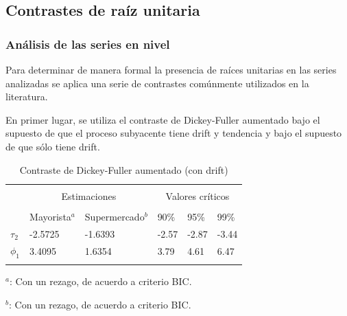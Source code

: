 \documentclass[12pt, twoside]{book}\usepackage[]{graphicx}\usepackage[]{color}
\numberwithin{equation}{section}
\numberwithin{theorem}{section}
\numberwithin{teorema}{section}
\numberwithin{defi}{section}
\numberwithin{prop}{section}
\numberwithin{defi}{section}
\theoremstyle{plain}
\begin{document}
\subsection{Contrastes de raíz unitaria}

\subsubsection{Análisis de las series en nivel}

Para determinar de manera formal la presencia de raíces unitarias en las series analizadas se aplica una serie de contrastes comúnmente utilizados en la literatura. 




En primer lugar, se utiliza el contraste de Dickey-Fuller aumentado bajo el supuesto de que el proceso subyacente tiene drift y tendencia y bajo el supuesto de que sólo tiene drift. 

\begin{center}
\begin{table}[!htpb]
\caption{Contraste de Dickey-Fuller aumentado (con drift)\label{tab:dickey1}}
\centering
\begin{threeparttable}
\begin{tabular}{@{}llllll@{}}
\toprule \\
\multicolumn{1}{l}{} & \multicolumn{2}{c}{Estimaciones} &
\multicolumn{3}{c}{Valores críticos} \\
\cmidrule(l){2-3} \cmidrule(l){4-6} \\
\multicolumn{1}{l}{} & \multicolumn{1}{c}{Mayorista$^{a}$} &
 \multicolumn{1}{c}{Supermercado$^{b}$} &
\multicolumn{1}{l}{90\%}&
\multicolumn{1}{l}{95\%}&
\multicolumn{1}{l}{99\%}
\\
\midrule
$\tau_{2} $  & -2.5725 &  -1.6393  & -2.57 & -2.87 & -3.44 \\
$\phi_{1} $  & 3.4095  &  1.6354   & 3.79 & 4.61 &  6.47\\
\bottomrule \\
\end{tabular}
\begin{tablenotes}
\small 
\item $^{a}$: Con un rezago, de acuerdo a criterio BIC. 
\item $^{b}$: Con un rezago, de acuerdo a criterio BIC. 
\end{tablenotes}
\end{threeparttable}
\end{table}
\end{center}
\end{document}
